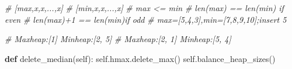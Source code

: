\documentclass[
]{article}
\newenvironment{Shaded}{}{}
\newcommand{\CommentTok}[1]{\textcolor[rgb]{0.38,0.63,0.69}{\textit{#1}}}
\newcommand{\KeywordTok}[1]{\textcolor[rgb]{0.00,0.44,0.13}{\textbf{#1}}}
\newcommand{\NormalTok}[1]{#1}
\newcommand{\VariableTok}[1]{\textcolor[rgb]{0.10,0.09,0.49}{#1}}
\begin{document}
\begin{Shaded}
\begin{Highlighting}[]
        \CommentTok{\# [max,x,x,...,x]}
        \CommentTok{\# [min,x,x,...,x]}
        \CommentTok{\# max \textless{}= min}
        \CommentTok{\# len(max) == len(min) if even}
        \CommentTok{\# len(max)+1 == len(min)if odd}
        \CommentTok{\# max=[5,4,3],min=[7,8,9,10];insert 5}

        \CommentTok{\# Maxheap:[1] Minheap:[2, 5]}
        \CommentTok{\# Maxheap:[2, 1] Minheap:[5, 4]}




    \KeywordTok{def}\NormalTok{ delete\_median(}\VariableTok{self}\NormalTok{):}
        \VariableTok{self}\NormalTok{.hmax.delete\_max()}
        \VariableTok{self}\NormalTok{.balance\_heap\_sizes()}
\end{Highlighting}
\end{Shaded}
\end{document}
